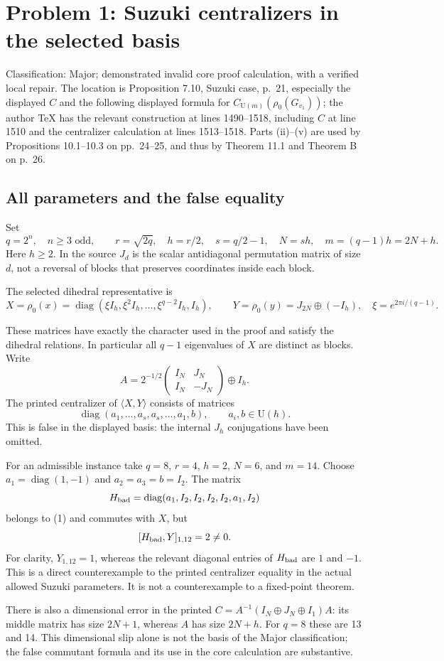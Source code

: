 \documentclass[10pt]{article}
\begin{document}
\section*{Problem 1: Suzuki centralizers in the selected basis}
Classification: Major; demonstrated invalid core proof calculation, with a verified local repair. The location is Proposition 7.10, Suzuki case, p. 21, especially the displayed \(C\) and the following displayed formula for \(C_{\mathrm U(m)}(\rho_0(G_{v_1}))\); the author TeX has the relevant construction at lines 1490–1518, including \(C\) at line 1510 and the centralizer calculation at lines 1513–1518. Parts (ii)–(v) are used by Propositions 10.1–10.3 on pp. 24–25, and thus by Theorem 11.1 and Theorem B on p. 26.\par
\subsection*{All parameters and the false equality}
Set \[q=2^n,\quad n\geq3\text{ odd},\qquad r=\sqrt{2q},\quad
 h=r/2,\quad s=q/2-1,\quad N=sh,\quad m=(q-1)h=2N+h.\] Here \(h\geq2\). In the source \(J_d\) is the scalar antidiagonal permutation matrix of size \(d\), not a reversal of blocks that preserves coordinates inside each block.\par
The selected dihedral representative is \[X=\rho_0(x)=
 \operatorname{diag}(\xi I_h,\xi^2 I_h,\ldots,\xi^{q-2}I_h,I_h),
 \qquad Y=\rho_0(y)=J_{2N}\oplus(-I_h),
 \quad \xi=e^{2\pi i/(q-1)} .\]\par
These matrices have exactly the character used in the proof and satisfy the dihedral relations. In particular all \(q-1\) eigenvalues of \(X\) are distinct as blocks. Write \[A=2^{-1/2}
 \begin{pmatrix}I_N&J_N\\ I_N&-J_N\end{pmatrix}\oplus I_h .\] The printed centralizer of \(\langle X,Y\rangle\) consists of matrices \[\operatorname{diag}(a_1,\ldots,a_s,a_s,\ldots,a_1,b),
 \qquad a_i,b\in\mathrm U(h).
 \tag{1}\] This is false in the displayed basis: the internal \(J_h\) conjugations have been omitted.\par
For an admissible instance take \(q=8\), \(r=4\), \(h=2\), \(N=6\), and \(m=14\). Choose \(a_1=\operatorname{diag}(1,-1)\) and \(a_2=a_3=b=I_2\). The matrix \[H_{\rm bad}=\operatorname{diag}(a_1,I_2,I_2,I_2,I_2,a_1,I_2)\] belongs to (1) and commutes with \(X\), but \[[H_{\rm bad},Y]_{1,12}=2\ne0.\] For clarity, \(Y_{1,12}=1\), whereas the relevant diagonal entries of \(H_{\rm bad}\) are \(1\) and \(-1\). This is a direct counterexample to the printed centralizer equality in the actual allowed Suzuki parameters. It is not a counterexample to a fixed-point theorem.\par
There is also a dimensional error in the printed \(C=A^{-1}(I_N\oplus J_N\oplus I_1)A\): its middle matrix has size \(2N+1\), whereas \(A\) has size \(2N+h\). For \(q=8\) these are 13 and 14. This dimensional slip alone is not the basis of the Major classification; the false commutant formula and its use in the core calculation are substantive.\par
\end{document}
